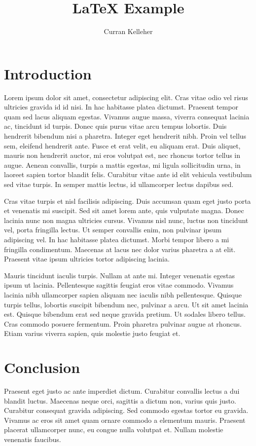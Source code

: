 \documentclass[a4paper,10pt]{article}
\title{LaTeX Example}
\author{Curran Kelleher}
\begin{document}
\maketitle
\section*{Introduction}
Lorem ipsum dolor sit amet, consectetur adipiscing elit. Cras vitae odio vel risus ultricies gravida id id nisi. In hac habitasse platea dictumst. Praesent tempor quam sed lacus aliquam egestas. Vivamus augue massa, viverra consequat lacinia ac, tincidunt id turpis. Donec quis purus vitae arcu tempus lobortis. Duis hendrerit bibendum nisi a pharetra. Integer eget hendrerit nibh. Proin vel tellus sem, eleifend hendrerit ante. Fusce et erat velit, eu aliquam erat. Duis aliquet, mauris non hendrerit auctor, mi eros volutpat est, nec rhoncus tortor tellus in augue. Aenean convallis, turpis a mattis egestas, mi ligula sollicitudin urna, in laoreet sapien tortor blandit felis. Curabitur vitae ante id elit vehicula vestibulum sed vitae turpis. In semper mattis lectus, id ullamcorper lectus dapibus sed.

Cras vitae turpis et nisl facilisis adipiscing. Duis accumsan quam eget justo porta et venenatis mi suscipit. Sed sit amet lorem ante, quis vulputate magna. Donec lacinia nunc non magna ultricies cursus. Vivamus nisl nunc, luctus non tincidunt vel, porta fringilla lectus. Ut semper convallis enim, non pulvinar ipsum adipiscing vel. In hac habitasse platea dictumst. Morbi tempor libero a mi fringilla condimentum. Maecenas at lacus nec dolor varius pharetra a at elit. Praesent vitae ipsum ultricies tortor adipiscing lacinia.

Mauris tincidunt iaculis turpis. Nullam at ante mi. Integer venenatis egestas ipsum ut lacinia. Pellentesque sagittis feugiat eros vitae commodo. Vivamus lacinia nibh ullamcorper sapien aliquam nec iaculis nibh pellentesque. Quisque turpis tellus, lobortis suscipit bibendum nec, pulvinar a arcu. Ut sit amet lacinia est. Quisque bibendum erat sed neque gravida pretium. Ut sodales libero tellus. Cras commodo posuere fermentum. Proin pharetra pulvinar augue at rhoncus. Etiam varius viverra sapien, quis molestie justo feugiat et.

\section*{Conclusion}
Praesent eget justo ac ante imperdiet dictum. Curabitur convallis lectus a dui blandit luctus. Maecenas neque orci, sagittis a dictum non, varius quis justo. Curabitur consequat gravida adipiscing. Sed commodo egestas tortor eu gravida. Vivamus ac eros sit amet quam ornare commodo a elementum mauris. Praesent placerat ullamcorper nunc, eu congue nulla volutpat et. Nullam molestie venenatis faucibus.
\end{document}
